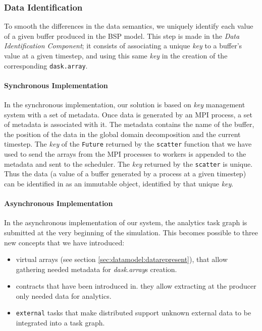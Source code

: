 
\subsubsection{Data Identification}\label{sec:datamodel:dataid}

To smooth the differences in the data semantics, we uniquely identify each value of a given buffer produced in the BSP model. This step is made in the \textit{Data Identification Component}; it consists of associating a unique \textit{key} to a buffer's value at a given timestep, and using this same \textit{key} in the creation of the corresponding \texttt{dask.array}.

\paragraph{Synchronous Implementation}
In the synchronous implementation, our solution is based on \dask \textit{key} management system with a set of metadata. Once data is generated by an MPI process, a set of metadata is associated with it. The metadata contains the name of the buffer, the position of the data in the global domain decomposition and the current timestep. The \textit{key} of the \texttt{Future} returned by the \texttt{scatter} function that we have used to send the arrays from the MPI processes to \dask workers is appended to the metadata and sent to the scheduler. The \textit{key} returned by the \texttt{scatter} is unique. Thus the data (a value of a buffer generated by a process at a given timestep) can be identified in \dask as an immutable object, identified by that unique \textit{key}. 


\paragraph{Asynchronous Implementation}
In the asynchronous implementation of our system, the analytics task graph is submitted at the very beginning of the simulation. This becomes possible to three new concepts that we have introduced: 
\begin{itemize}
    \item \deisa virtual arrays (see section \ref{sec:datamodel:datarepresent}), that allow gathering needed metadata for \textit{dask.array}s creation. 
    \item contracts that have been introduced in\cite{mommessin_automatic_2017}. they allow extracting at the producer only needed data for analytics. 
    \item \texttt{external} tasks that make \dask distributed support unknown external data to be integrated into a task graph. 
\end{itemize}

